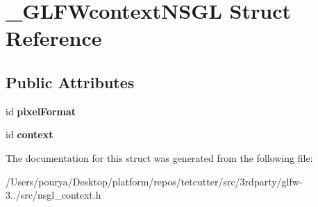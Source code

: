 \hypertarget{struct__GLFWcontextNSGL}{}\section{\+\_\+\+G\+L\+F\+Wcontext\+N\+S\+G\+L Struct Reference}
\label{struct__GLFWcontextNSGL}
\subsection*{Public Attributes}
\begin{DoxyCompactItemize}
\item 
\hypertarget{struct__GLFWcontextNSGL_a1acd6f1833071d5e003d343de53e6154}{}id {\bfseries pixel\+Format}\label{struct__GLFWcontextNSGL_a1acd6f1833071d5e003d343de53e6154}

\item 
\hypertarget{struct__GLFWcontextNSGL_a2203da611da8551da7ddd6ac9796297a}{}id {\bfseries context}\label{struct__GLFWcontextNSGL_a2203da611da8551da7ddd6ac9796297a}

\end{DoxyCompactItemize}


The documentation for this struct was generated from the following file\+:\begin{DoxyCompactItemize}
\item 
/\+Users/pourya/\+Desktop/platform/repos/tetcutter/src/3rdparty/glfw-\/3../src/nsgl\+\_\+context.\+h\end{DoxyCompactItemize}
